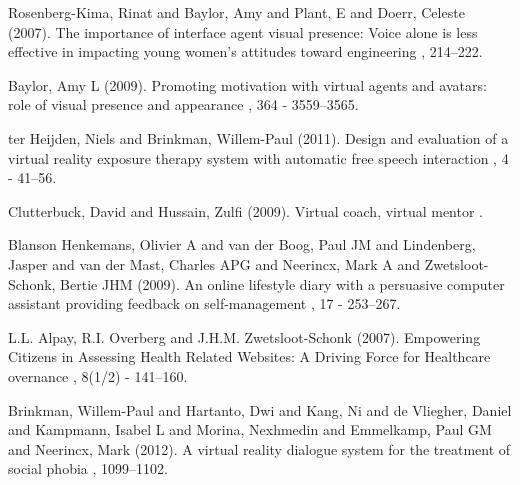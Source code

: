 \documentclass[twoside]{article}
\begin{document}
\begin{multicols}{2}
\begin{thebibliography}{99}
Rosenberg-Kima, Rinat and Baylor, Amy and Plant, E and Doerr, Celeste (2007).
\newblock The importance of interface agent visual presence: Voice alone is less effective in impacting young women’s attitudes toward engineering
, 214--222.


Baylor, Amy L (2009).
\newblock Promoting motivation with virtual agents and avatars: role of visual presence and appearance
, 364 - 3559--3565.


ter Heijden, Niels and Brinkman, Willem-Paul (2011).
\newblock Design and evaluation of a virtual reality exposure therapy system with automatic free speech interaction
, 4 - 41--56.


Clutterbuck, David and Hussain, Zulfi (2009).
\newblock Virtual coach, virtual mentor
.


Blanson Henkemans, Olivier A and van der Boog, Paul JM and Lindenberg, Jasper and van der Mast, Charles APG and Neerincx, Mark A and Zwetsloot-Schonk, Bertie JHM (2009).
\newblock An online lifestyle diary with a persuasive computer assistant providing feedback on self-management
, 17 - 253--267.


L.L. Alpay, R.I. Overberg and J.H.M. Zwetsloot-Schonk (2007).
\newblock Empowering Citizens in Assessing Health Related Websites: A Driving Force for Healthcare overnance
, 8(1/2) - 141--160.

Brinkman, Willem-Paul and Hartanto, Dwi and Kang, Ni and de Vliegher, Daniel and Kampmann, Isabel L and Morina, Nexhmedin and Emmelkamp, Paul GM and Neerincx, Mark (2012).
\newblock A virtual reality dialogue system for the treatment of social phobia
, 1099--1102.


\end{thebibliography}


\end{multicols}
\end{document}
